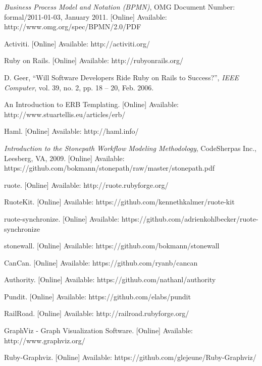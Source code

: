 \renewcommand{\bibname}{References}
\begin{thebibliography}{99}

\textit{Business Process Model and Notation
(BPMN)}, OMG Document Number: formal/2011-01-03, January 2011. [Online] Available: http://www.omg.org/spec/BPMN/2.0/PDF

Activiti. [Online] Available: http://activiti.org/

Ruby on Rails. [Online] Available: http://rubyonrails.org/

D. Geer, ``Will Software Developers Ride Ruby on Rails to Success?'', \textit{IEEE Computer}, vol. 39, no. 2, pp. 18 -- 20, Feb. 2006.

An Introduction to ERB Templating. [Online] Available: http://www.stuartellis.eu/articles/erb/

Haml. [Online] Available: http://haml.info/

\textit{Introduction to the Stonepath Workflow Modeling Methodology},
CodeSherpas Inc., Leesberg, VA, 2009. [Online] Available: https://github.com/bokmann/stonepath/raw/master/stonepath.pdf

ruote. [Online] Available: http://ruote.rubyforge.org/

RuoteKit. [Online] Available: https://github.com/kennethkalmer/ruote-kit

ruote-synchronize. [Online] Available: https://github.com/adrienkohlbecker/ruote-synchronize

stonewall. [Online] Available: https://github.com/bokmann/stonewall

CanCan. [Online] Available: https://github.com/ryanb/cancan

Authority. [Online] Available: https://github.com/nathanl/authority

Pundit. [Online] Available: https://github.com/elabs/pundit

RailRoad. [Online] Available: http://railroad.rubyforge.org/

GraphViz - Graph Visualization Software. [Online] Available: http://www.graphviz.org/

Ruby-Graphviz. [Online] Available: https://github.com/glejeune/Ruby-Graphviz/


\end{thebibliography}
